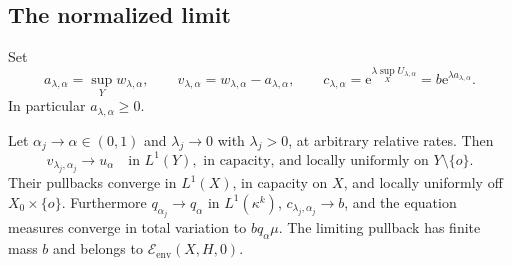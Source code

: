 \subsection{The normalized limit}

Set
\[
 a_{\lambda,\alpha}=\sup_Yw_{\lambda,\alpha},\qquad
 v_{\lambda,\alpha}=w_{\lambda,\alpha}-a_{\lambda,\alpha},\qquad
 c_{\lambda,\alpha}=\mathrm e^{\lambda\sup_XU_{\lambda,\alpha}}
                       =b\mathrm e^{\lambda a_{\lambda,\alpha}}.
\]
In particular $a_{\lambda,\alpha}\geq0$.

\begin{theorem}\label{thm:radial-integrable-selection}
Let $\alpha_j\to\alpha\in(0,1)$ and $\lambda_j\to0$ with $\lambda_j>0$, at arbitrary relative rates. Then
\[
 v_{\lambda_j,\alpha_j}\longrightarrow u_\alpha
 \quad\text{in }L^1(Y),\text{ in capacity, and locally uniformly on }Y\setminus\{o\}.
\]
Their pullbacks converge in $L^1(X)$, in capacity on $X$, and locally uniformly off $X_0\times\{o\}$. Furthermore $q_{\alpha_j}\to q_\alpha$ in $L^1(\kappa^k)$, $c_{\lambda_j,\alpha_j}\to b$, and the equation measures converge in total variation to $bq_\alpha\mu$. The limiting pullback has finite mass $b$ and belongs to $\mathcal E_{\mathrm{env}}(X,H,0)$.
\end{theorem}
